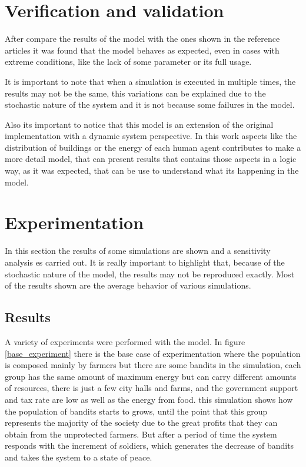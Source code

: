 \documentclass{wscpaperproc}
\begin{document}
\section{Verification and validation}

After compare the results of the model with the ones shown in the reference
articles it was found that the model behaves as expected, even in cases with
extreme conditions, like the lack of some parameter or its full usage.

It is important to note that when a simulation is executed in multiple
times, the results may not be the same, this variations can be explained due
to the stochastic nature of the system and it is not because some failures in
the model.

Also its important to notice that this model is an extension of the original
implementation with a dynamic system perspective. In this work aspects like
the distribution of buildings or the energy of each human agent contributes
to make a more detail model, that can present results that contains those
aspects in a logic way, as it was expected, that can be use to understand what
its happening in the model.

\section{Experimentation}

In this section the results of some simulations are shown and a sensitivity
analysis es carried out. It is really important to highlight that, because
of the stochastic nature of the model, the results may not be reproduced
exactly. Most of the results shown are the average behavior of various
simulations.

\subsection{Results}

A variety of experiments were performed with the model. In figure
\ref{base_experiment} there is the base case of experimentation where the
population is composed mainly by farmers but there are some bandits in the
simulation, each group has the same amount of maximum energy but can carry
different amounts of resources, there is just a few city halls and farms, and
the government support and tax rate are low as well as the energy from food.
this simulation shows how the population of bandits starts to grows, until the
point that this group represents the majority of the society due to the great
profits that they can obtain from the unprotected farmers. But after a period
of time the system responds with the increment of soldiers, which generates the
decrease of bandits and takes the system to a state of peace.
\end{document}
